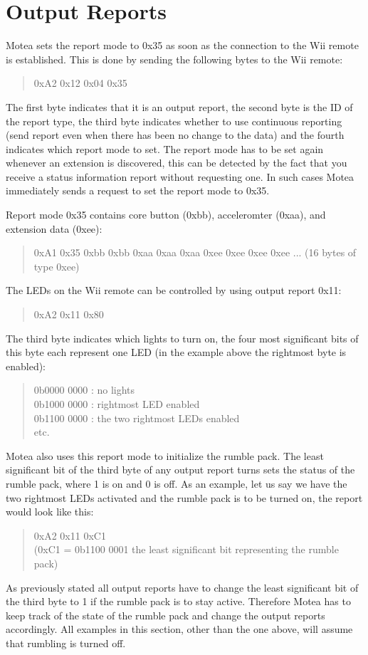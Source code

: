 \chapter{Output Reports}
\label{app:outputReports}
Motea sets the report mode to 0x35 as soon as the connection to the Wii remote is established. This is done by sending the following bytes to the Wii remote:
\begin{quote}
0xA2 0x12 0x04 0x35
\end{quote}
The first byte indicates that it is an output report, the second byte is the ID of the report type, the third byte indicates whether to use continuous reporting (send report even when there has been no change to the data) and the fourth indicates which report mode to set. The report mode has to be set again whenever an extension is discovered, this can be detected by the fact that you receive a status information report without requesting one. In such cases Motea immediately sends a request to set the report mode to 0x35.

Report mode 0x35 contains core button (0xbb), acceleromter (0xaa), and extension data (0xee):
\begin{quote}
0xA1 0x35 0xbb 0xbb 0xaa 0xaa 0xaa 0xee 0xee 0xee 0xee ... (16 bytes of type 0xee)
\end{quote}

The LEDs on the Wii remote can be controlled by using output report 0x11:
\begin{quote}
0xA2 0x11 0x80
\end{quote}
The third byte indicates which lights to turn on, the four most significant bits of this byte each represent one LED (in the example above the rightmost byte is enabled):
\begin{quote}
0b0000 0000 : no lights\\
0b1000 0000 : rightmost LED enabled\\
0b1100 0000 : the two rightmost LEDs enabled\\
etc.
\end{quote}
Motea also uses this report mode to initialize the rumble pack. The least significant bit of the third byte of any output report turns sets the status of the rumble pack, where 1 is on and 0 is off. As an example, let us say we have the two rightmost LEDs activated and the rumble pack is to be turned on, the report would look like this:
\begin{quote}	
0xA2 0x11 0xC1\\
(0xC1 = 0b1100 0001 the least significant bit representing the rumble pack)
\end{quote}
As previously stated all output reports have to change the least significant bit of the third byte to 1 if the rumble pack is to stay active. Therefore Motea has to keep track of the state of the rumble pack and change the output reports accordingly. All examples in this section, other than the one above, will assume that rumbling is turned off.


